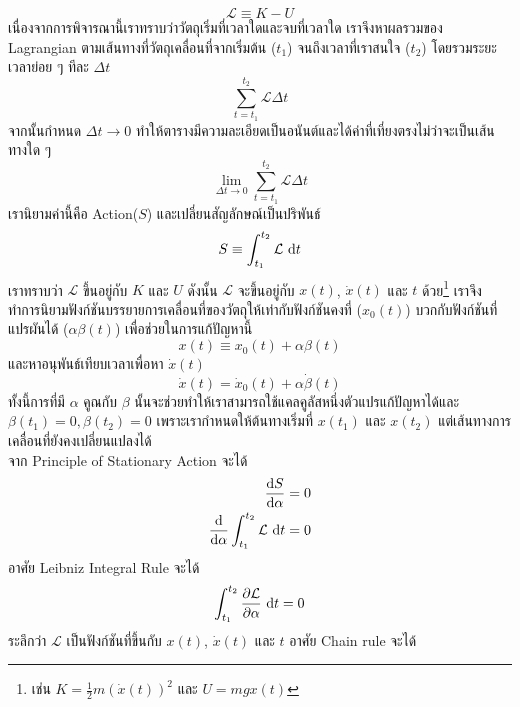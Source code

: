 \documentclass[a4paper,12pt]{article}
\begin{document}
\begin{equation}
	\mathcal{L}\equiv K-U
\end{equation}
เนื่องจากการพิจารณานี้เราทราบว่าวัตถุเริ่มที่เวลาใดและจบที่เวลาใด เราจึงหาผลรวมของ Lagrangian ตามเส้นทางที่วัตถุเคลื่อนที่จากเริ่มต้น (\(t_1\)) จนถึงเวลาที่เราสนใจ (\(t_2\)) โดยรวมระยะเวลาย่อย ๆ ทีละ \(\Delta t\)
\begin{equation*}
	\sum_{t=t_1}^{t_2}\mathcal{L}\Delta t
\end{equation*}
จากนั้นกำหนด \(\Delta t \to 0\) ทำให้ตารางมีความละเอียดเป็นอนันต์และได้ค่าที่เที่ยงตรงไม่ว่าจะเป็นเส้นทางใด ๆ
\begin{equation*}
	\lim_{\Delta t \to 0}\sum_{t=t_1}^{t_2}\mathcal{L}\Delta t
\end{equation*}
เรานิยามค่านี้คือ Action(\(S\)) และเปลี่ยนสัญลักษณ์เป็นปริพันธ์
\begin{equation}
	S\equiv\int_{t_1}^{t_2}\mathcal{L}\,\dl t
\end{equation}
เราทราบว่า \(\mathcal{L}\) ขึ้นอยู่กับ \(K\) และ \(U\) ดังนั้น \(\mathcal{L}\) จะขึ้นอยู่กับ \(x(t)\), \(\dot{x}(t)\) และ \(t\) ด้วย\footnote{เช่น \(K=\frac{1}{2}m(\dot{x}(t))^2\) และ \(U=mgx(t)\)} เราจึงทำการนิยามฟังก์ชันบรรยายการเคลื่อนที่ของวัตถุให้เท่ากับฟังก์ชันคงที่ (\(x_0(t)\)) บวกกับฟังก์ชันที่แปรผันได้ (\(\alpha\beta(t)\)) เพื่อช่วยในการแก้ปัญหานี้
\begin{equation}
	x(t)\equiv x_0(t)+\alpha\beta(t)
	\label{eq:path}\end{equation}
และหาอนุพันธ์เทียบเวลาเพื่อหา \(\dot{x}(t)\)
\begin{equation}
	\dot{x}(t)=\dot{x}_0(t)+\alpha\dot{\beta}(t)
	\label{eq:velocity}\end{equation}
ทั้งนี้การที่มี \(\alpha\) คูณกับ \(\beta\) นั้นจะช่วยทำให้เราสามารถใช้แคลคูลัสหนึ่งตัวแปรแก้ปัญหาได้และ \(\beta(t_1)=0,\beta(t_2)=0\) เพราะเรากำหนดให้ต้นทางเริ่มที่ \(x(t_1)\) และ \(x(t_2)\) แต่เส้นทางการเคลื่อนที่ยังคงเปลี่ยนแปลงได้\\
จาก Principle of Stationary Action จะได้
\begin{align*}
	\diff{S}{\alpha}                                   & =0 \\
	\diff*{\int_{t_1}^{t_2}\mathcal{L}\,\dl t}{\alpha} & =0
\end{align*}
อาศัย Leibniz Integral Rule จะได้
\begin{equation*}
	\int_{t_1}^{t_2}\diffp{\mathcal{L}}{\alpha}\,\dl t=0
\end{equation*}
ระลึกว่า \(\mathcal{L}\) เป็นฟังก์ชันที่ขึ้นกับ \(x(t)\), \(\dot{x}(t)\) และ \(t\) อาศัย Chain rule จะได้
\end{document}
